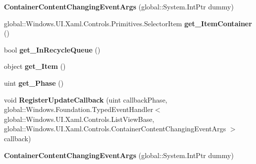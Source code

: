 \begin{DoxyCompactItemize}
{\bfseries Container\+Content\+Changing\+Event\+Args} (global\+::\+System.\+Int\+Ptr dummy)
\item 
\mbox{\label{class_windows_1_1_u_i_1_1_xaml_1_1_controls_1_1_container_content_changing_event_args_a5fc601b8ea34400cac39f7c694925574}} 
global\+::\+Windows.\+U\+I.\+Xaml.\+Controls.\+Primitives.\+Selector\+Item {\bfseries get\+\_\+\+Item\+Container} ()
\item 
\mbox{\label{class_windows_1_1_u_i_1_1_xaml_1_1_controls_1_1_container_content_changing_event_args_aa88d1a956dccd408c22cd68822cbf018}} 
bool {\bfseries get\+\_\+\+In\+Recycle\+Queue} ()
\item 
\mbox{\label{class_windows_1_1_u_i_1_1_xaml_1_1_controls_1_1_container_content_changing_event_args_adf6a56892a3645903bdbeb798faa1e67}} 
object {\bfseries get\+\_\+\+Item} ()
\item 
\mbox{\label{class_windows_1_1_u_i_1_1_xaml_1_1_controls_1_1_container_content_changing_event_args_a83b5777887886032cce986dfbafd12ac}} 
uint {\bfseries get\+\_\+\+Phase} ()
\item 
\mbox{\label{class_windows_1_1_u_i_1_1_xaml_1_1_controls_1_1_container_content_changing_event_args_af9bbdca8851131ee69d2767595d51531}} 
void {\bfseries Register\+Update\+Callback} (uint callback\+Phase, global\+::\+Windows.\+Foundation.\+Typed\+Event\+Handler$<$ global\+::\+Windows.\+U\+I.\+Xaml.\+Controls.\+List\+View\+Base, global\+::\+Windows.\+U\+I.\+Xaml.\+Controls.\+Container\+Content\+Changing\+Event\+Args $>$ callback)
\item 
\mbox{\label{class_windows_1_1_u_i_1_1_xaml_1_1_controls_1_1_container_content_changing_event_args_a04e2ae3d4530956b6f2478107d6aca2a}} 
{\bfseries Container\+Content\+Changing\+Event\+Args} (global\+::\+System.\+Int\+Ptr dummy)

\end{DoxyCompactItemize}
